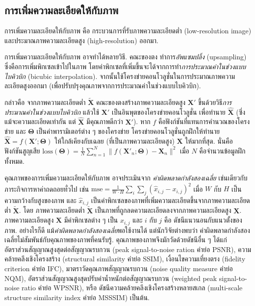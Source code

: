 \subsection{การเพิ่มความละเอียดให้กับภาพ}
\label{sec: convapp increase resolution}
การเพิ่มความละเอียดให้กับภาพ คือ กระบวนการที่รับภาพความละเอียดต่ำ (low-resolution image)
และประมาณภาพความละเอียดสูง (high-resolution) ออกมา.

การเพิ่มความละเอียดให้กับภาพ อาจทำได้หลายวิธี.
คณะของตง\cite{DongEtAl2014}
ทำการ\textit{อัพแซมปลิ้ง} (upsampling) ซึ่งคือการเพิ่มพิกเซลเข้าไปในภาพ โดยค่าพิกเซลที่เพิ่มขึ้นจะได้จากการทำ\textit{การประมาณค่าในช่วงแบบไบคิวบิก} (bicubic interpolation).
จากนั้นใช้โครงข่ายคอนโวลูชั่นในการประมาณภาพความละเอียดสูงออกมา (เพื่อปรับปรุงคุณภาพจากการประมาณค่าในช่วงแบบไบคิวบิก).

กล่าวคือ จากภาพความละเอียดต่ำ $\bm{\tilde{X}}$ 
คณะของตงสร้างภาพความละเอียดสูง $\bm{X}'$ ขึ้นด้วยวิธี\textit{การประมาณค่าในช่วงแบบไบคิวบิก}
แล้วใช้ $\bm{X}'$ เป็นอินพุตของโครงข่ายคอนโวลูชั่น เพื่อทำนาย $\bm{\hat{X}}$
(ซึ่ง แม้จะความละเอียดเท่ากัน แต่ $\bm{\hat{X}}$ มีคุณภาพดีกว่า $\bm{X}'$).
%
หาก $f$ คือฟังก์ชันที่แทนการคำนวณของโครงข่าย และ $\bm{\Theta}$ เป็นค่าพารามิเตอร์ต่าง ๆ ของโครงข่าย
โครงข่ายคอนโวลูชั่นถูกฝึกให้ทำนาย $\bm{\hat{X}} = f(\bm{X}'; \bm{\Theta})$ ให้ใกล้เคียงกับเฉลย (ที่เป็นภาพความละเอียดสูง) $\bm{X}$ ให้มากที่สุด.
นั่นคือ ฟังก์ชันสูญเสีย $\mathrm{loss}(\bm{\Theta}) = \frac{1}{N} \sum_{n=1}^N \| f(\bm{X}'_n; \bm{\Theta}) - \bm{X}_n \|^2$
เมื่อ $N$ คือจำนวนข้อมูลฝึกทั้งหมด.

คุณภาพของการเพิ่มความละเอียดให้กับภาพ อาจประเมินจาก 
\textit{ค่าผิดพลาดกำลังสองเฉลี่ย} เช่นเดียวกับภาระกิจการหาค่าถดถอยทั่วไป
เช่น $\mathrm{mse} = \frac{1}{W \cdot H} \sum_i \sum_j (\hat{x}_{i,j} - x_{i,j})^2$ 
เมื่อ $W$ กับ $H$ เป็นความกว้างกับสูงของภาพ
และ
$\hat{x}_{i,j}$ เป็นค่าพิกเซลของภาพที่เพิ่มความละเอียดขึ้นจากภาพความละเอียดต่ำ $\tilde{\bm{X}}$. 
โดย ภาพความละเอียดต่ำ $\tilde{\bm{X}}$ เป็นภาพที่ถูกลดความละเอียดลงจากภาพความละเอียดสูง $\bm{X}$.
ภาพความละเอียดสูง $\bm{X}$ มีค่าพิกเซลต่าง ๆ เป็น $x_{i,j}$ และ $i$ กับ $j$ คือ ดัชนีแนวนอนกับแนวตั้งของภาพ.
อย่างไรก็ดี แม้\textit{ค่าผิดพลาดกำลังสองเฉลี่ย}พอใช้งานได้ แต่นักวิจัยต่างพบว่า ค่าผิดพลาดกำลังสองเฉลี่ยไม่สัมพันธ์กับคุณภาพของภาพที่คนรับรู้\cite{WangEtAl2003a}.
คุณภาพของภาพจึงมักวัดด้วยดัชนีอื่น ๆ ได้แก่
อัตราส่วนสัญญาณสูงสุดต่อสัญญาณรบกวน (peak signal-to-noise ration คำย่อ PSNR\cite{WangEtAl2004a}),
ความคล้ายคลึงเชิงโครงสร้าง (structural similarity คำย่อ SSIM\cite{WangEtAl2004a}),
เงื่อนไขความเที่ยงตรง (fidelity criterion คำย่อ IFC\cite{SheikhEtAl2005}),
มาตราวัดคุณภาพสัญญาณรบกวน (noise quality measure คำย่อ NQM\cite{Damera-VenkataEtAl2000}),
อัตราส่วนสัญญาณสูงสุดปรับค่าน้ำหนักต่อสัญญาณรบกวน (weighted peak signal-to-noise ratio คำย่อ WPSNR\cite{WangEtAl2003a}),
หรือ ดัชนีความคล้ายคลึงเชิงโครงสร้างหลายสเกล (multi-scale  structure  similarity  index คำย่อ MSSSIM\cite{WangEtAl2003a}) เป็นต้น.

